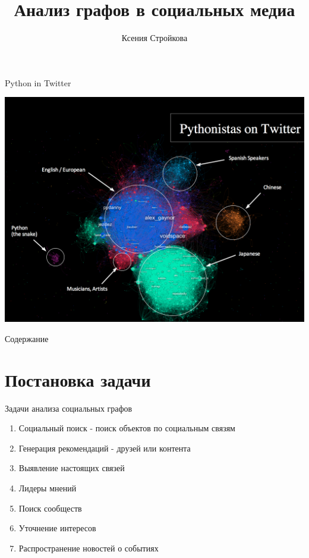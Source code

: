 \documentclass[10pt]{beamer}
\author{Ксения Стройкова}
\title{\newline \newline \newline Анализ графов в социальных медиа}
\let\otp\titlepage
\renewcommand{\titlepage}{\otp\addtocounter{framenumber}{-1}}
\begin{document}
\begin{frame}[plain]
\titlepage
\end{frame}

\begin{frame}{Python in Twitter}

\begin{center}
\includegraphics[scale=0.18]{images/python.png}
\end{center}

\end{frame}

\begin{frame}{Содержание}
\tableofcontents
\end{frame}

\section{Постановка задачи}

\begin{frame}{Задачи анализа социальных графов}

{\small
\begin{enumerate}
\item Социальный поиск - поиск объектов по социальным связям
\item Генерация рекомендаций - друзей или контента
\item Выявление настоящих связей
\item Лидеры мнений
\item Поиск сообществ
\item Уточнение интересов
\item Распространение новостей о событиях
\end{enumerate}
}

\end{frame}
\end{document}
